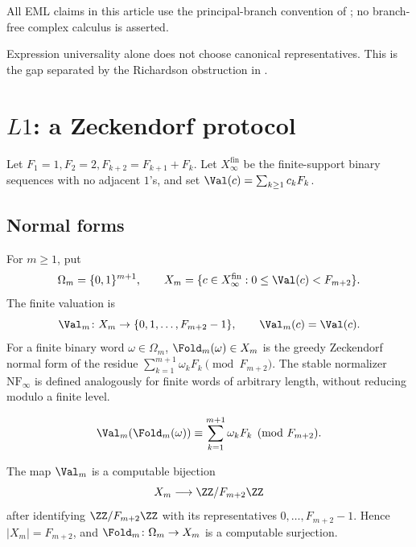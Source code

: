 \begin{remark}\label{rem:eml-variants}
All EML claims in this article use the principal-branch convention of
; no branch-free complex calculus is asserted.
\end{remark}

\begin{remark}\label{rem:no-canon}
Expression universality alone does not choose canonical representatives.  This
is the gap separated by the Richardson obstruction in .
\end{remark}



\section{\texorpdfstring{\(L1\)}{L1}: a Zeckendorf protocol}\label{sec:L1}

Let \(F_1=1,F_2=2,F_{k+2}=F_{k+1}+F_k\).  Let
\(X_\infty^{\mathrm{fin}}\) be the finite-support binary sequences with no
adjacent \(1\)'s, and set
\(\Val(c)=\sum_{k\ge1}c_kF_k\).

\subsection{Normal forms}\label{ssec:fold}

\begin{definition}\label{def:fold}
For \(m\ge1\), put
\[
  \Omega_m=\{0,1\}^{m+1},
  \qquad
  X_m=\{c\in X_\infty^{\mathrm{fin}}:0\le \Val(c)<F_{m+2}\}.
\]
The finite valuation is
\[
  \Val_m\colon X_m\to \{0,1,\ldots,F_{m+2}-1\},
  \qquad \Val_m(c)=\Val(c).
\]
For a finite binary word \(\omega\in\Omega_m\), \(\Fold_m(\omega)\in X_m\) is
the greedy Zeckendorf normal form of the residue
\(\sum_{k=1}^{m+1}\omega_kF_k\pmod {F_{m+2}}\).  The stable normalizer
\(\mathrm{NF}_\infty\) is defined analogously for finite words of arbitrary
length, without reducing modulo a finite level.
\end{definition}

\begin{equation}\label{eq:fold-residue}
  \Val_m(\Fold_m(\omega))\equiv\sum_{k=1}^{m+1}\omega_kF_k\pmod {F_{m+2}} .
\end{equation}

\begin{proposition}
\label{prop:finite-zeckendorf-residue-interface}
The map \(\Val_m\) is a computable bijection
\[
  X_m\longrightarrow \ZZ/F_{m+2}\ZZ
\]
after identifying \(\ZZ/F_{m+2}\ZZ\) with its representatives
\(0,\ldots,F_{m+2}-1\).  Hence \(|X_m|=F_{m+2}\), and
\(\Fold_m\colon\Omega_m\to X_m\) is a computable surjection.
\end{proposition}

